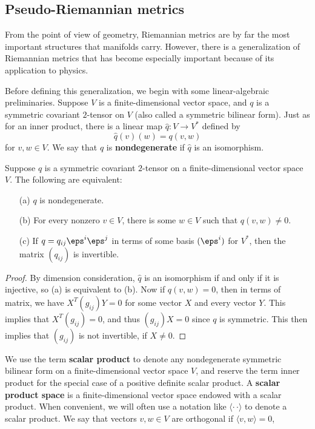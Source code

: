 \subsection{Pseudo-Riemannian metrics}
From the point of view of geometry, Riemannian metrics are by far the most 
important structures that manifolds carry. However, there is a generalization 
of Riemannian metrics that has become especially important because of its 
application to physics.\par
Before defining this generalization, we begin with some linear-algebraic 
preliminaries. Suppose $V$ is a finite-dimensional vector space, and $q$ is 
a symmetric covariant $2$-tensor on $V$ (also called a symmetric bilinear 
form). Just as for an inner product, there is a linear map $\widehat{q}:V\to V^*$ 
defined by
\[\widehat{q}(v)(w)=q(v,w)\]
for $v,w\in V$. We say that $q$ is \textbf{nondegenerate} if $\widehat{q}$ is an isomorphism.
\begin{lemma}
Suppose $q$ is a symmetric covariant $2$-tensor on a finite-dimensional vector 
space $V$. The following are equivalent:
\begin{itemize}
\item[(a)] $q$ is nondegenerate.
\item[(b)] For every nonzero $v\in V$, there is some $w\in V$ such that $q(v,w)\neq 0$.
\item[(c)] If $q=q_{ij}\eps^i\eps^j$ in terms of some basis $(\eps^i)$ for $V^*$, 
then the matrix $(q_{ij})$ is invertible. 
\end{itemize}
\end{lemma}
\begin{proof}
By dimension consideration, $\widehat{q}$ is an isomorphism if and only if it is injective, so (a) 
is equivalent to (b). Now if $q(v,w)=0$, then in terms of matrix, we have $X^T(g_{ij})Y=0$ for some 
vector $X$ and every vector $Y$. This implies that $X^T(g_{ij})=0$, and thus $(g_{ij})X=0$ since $q$ 
is symmetric. This then implies that $(g_{ij})$ is not invertible, if $X\neq 0$. 
\end{proof}
We use the term \textbf{scalar product} to denote any nondegenerate 
symmetric bilinear form on a finite-dimensional vector space $V$, and 
reserve the term inner product for the special case of a positive definite 
scalar product. A \textbf{scalar product space} is a finite-dimensional 
vector space endowed with a scalar product. When convenient, we will often 
use a notation like $\langle\cdot\,\cdot\rangle$ to denote a scalar product. 
We say that vectors $v,w\in V$ are orthogonal if $\langle v,w\rangle=0$, 
